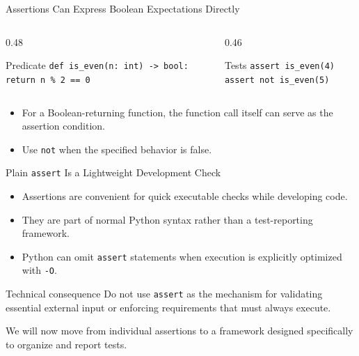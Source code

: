 \documentclass[aspectratio=169,10pt]{beamer}
\begin{document}
\begin{frame}{Assertions Can Express Boolean Expectations Directly}
  \begin{columns}[T,onlytextwidth]
    \begin{column}{0.48\textwidth}
      \begin{block}{Predicate}
        \texttt{def is\_even(n: int) -> bool:}\\
        \hspace*{0.20in}\texttt{return n \% 2 == 0}
      \end{block}
    \end{column}

    \begin{column}{0.46\textwidth}
      \begin{block}{Tests}
        \texttt{assert is\_even(4)}\\[0.08in]
        \texttt{assert not is\_even(5)}
      \end{block}
    \end{column}
  \end{columns}

  \begin{itemize}
    \item For a Boolean-returning function, the function call itself can serve as the assertion condition.
    \item Use \texttt{not} when the specified behavior is false.
  \end{itemize}
\end{frame}

\begin{frame}{Plain \texttt{assert} Is a Lightweight Development Check}
  \begin{itemize}
    \item Assertions are convenient for quick executable checks while developing code.
    \item They are part of normal Python syntax rather than a test-reporting framework.
    \item Python can omit \texttt{assert} statements when execution is explicitly optimized with \texttt{-O}.
  \end{itemize}

  \begin{alertblock}{Technical consequence}
    Do not use \texttt{assert} as the mechanism for validating essential external input or enforcing requirements that must always execute.
  \end{alertblock}

  \begin{keyidea}
    We will now move from individual assertions to a framework designed specifically to organize and report tests.
  \end{keyidea}
\end{frame}
\end{document}
